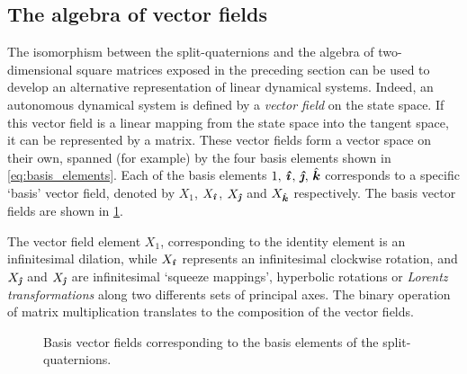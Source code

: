 \subsection{The algebra of vector fields}
\label{ssec:vf_algebra}
The isomorphism between the split-quaternions and the algebra of two-dimensional square matrices exposed in the preceding section can be used to develop an alternative representation of linear dynamical systems. Indeed, an autonomous dynamical system is defined by a \emph{vector field} on the state space. If this vector field is a linear mapping from the state space into the tangent space, it can be represented by a matrix. These vector fields form a vector space on their own, spanned (for example) by the four basis elements shown in \cref{eq:basis_elements}. Each of the basis elements $1,\,\quati,\,\quatj,\,\quatk$ corresponds to a specific `basis' vector field, denoted by $X_1$, $X_{\quati}$, $X_{\quatj}$ and $X_{\quatk}$ respectively. The basis vector fields are shown in \cref{fig:basis_vf}. 

The vector field element $X_1$, corresponding to the identity element is an infinitesimal dilation, while $X_{\quati}$ represents an infinitesimal clockwise rotation, and $X_{\quatj}$ and $X_{\quatj}$ are infinitesimal `squeeze mappings', hyperbolic rotations or \emph{Lorentz transformations} along two differents sets of principal axes. The binary operation of matrix multiplication translates to the composition of the vector fields.
\begin{figure}[h!]
    \centering
    
    \caption{Basis vector fields corresponding to the basis elements of the split-quaternions.}
    \label{fig:basis_vf}
\end{figure}

